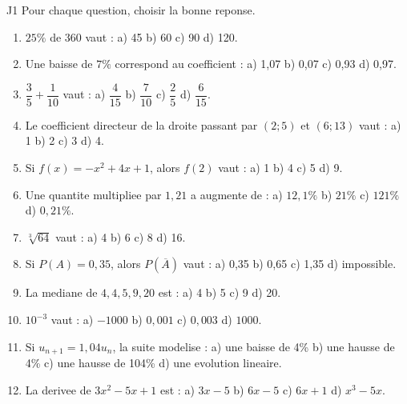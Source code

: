\documentclass[11pt,a4paper]{article}
\begin{document}
\begin{exo}{J1}
Pour chaque question, choisir la bonne reponse.
\begin{enumerate}
    \item $25\%$ de 360 vaut : a) 45 b) 60 c) 90 d) 120.
    \item Une baisse de $7\%$ correspond au coefficient : a) 1,07 b) 0,07 c) 0,93 d) 0,97.
    \item $\dfrac35+\dfrac{1}{10}$ vaut : a) $\dfrac{4}{15}$ b) $\dfrac{7}{10}$ c) $\dfrac{2}{5}$ d) $\dfrac{6}{15}$.
    \item Le coefficient directeur de la droite passant par $(2;5)$ et $(6;13)$ vaut : a) 1 b) 2 c) 3 d) 4.
    \item Si $f(x)=-x^2+4x+1$, alors $f(2)$ vaut : a) 1 b) 4 c) 5 d) 9.
    \item Une quantite multipliee par $1,21$ a augmente de : a) $12,1\%$ b) $21\%$ c) $121\%$ d) $0,21\%$.
    \item $\sqrt[3]{64}$ vaut : a) 4 b) 6 c) 8 d) 16.
    \item Si $P(A)=0,35$, alors $P(\overline A)$ vaut : a) 0,35 b) 0,65 c) 1,35 d) impossible.
    \item La mediane de $4,4,5,9,20$ est : a) 4 b) 5 c) 9 d) 20.
    \item $10^{-3}$ vaut : a) $-1000$ b) $0,001$ c) $0,003$ d) $1000$.
    \item Si $u_{n+1}=1,04u_n$, la suite modelise : a) une baisse de 4\% b) une hausse de 4\% c) une hausse de 104\% d) une evolution lineaire.
    \item La derivee de $3x^2-5x+1$ est : a) $3x-5$ b) $6x-5$ c) $6x+1$ d) $x^3-5x$.
\end{enumerate}
\end{exo}
\end{document}
